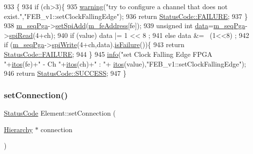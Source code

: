 \begin{DoxyCode}
933                                                                   \{
934   \textcolor{keywordflow}{if} (ch>3)\{
935     \hyperlink{classObject_a65cd4fda577711660821fd2cd5a3b4c9}{warning}(\textcolor{stringliteral}{"try to configure a channel that does not exist."},\textcolor{stringliteral}{"FEB\_v1::setClockFallingEdge"});
936     \textcolor{keywordflow}{return} \hyperlink{classStatusCode_a6f565cbeadc76d14c72f047e5e85eb4ba3da73d4c469762eb9d3c960368252b26}{StatusCode::FAILURE};
937   \}
938   \hyperlink{classFEB__v1_a6c7804ac86796f233a8393043adf2e77}{m\_seqPga}->\hyperlink{classSeqPGA_ac998ce3a6d9b5f2e88cc8393f8c1df53}{setSpiAdd}(\hyperlink{classFEB__v1_a4e1945c2d5b434125f375e9d0fc6d99f}{m\_feAddress}[fe]);
939   \textcolor{keywordtype}{unsigned} \textcolor{keywordtype}{int} \hyperlink{classFEB__v1_a6bca4320bd3bbbc32efc81097f33421a}{data}=\hyperlink{classFEB__v1_a6c7804ac86796f233a8393043adf2e77}{m\_seqPga}->\hyperlink{classSeqPGA_ab3d0e5e5d4014bc7a92588a76b8713d4}{spiRead}(4+ch);
940   \textcolor{keywordflow}{if} (value)  data |= 1 << 8  ;
941   \textcolor{keywordflow}{else}        data &= ~(1<<8) ;
942   \textcolor{keywordflow}{if} (\hyperlink{classFEB__v1_a6c7804ac86796f233a8393043adf2e77}{m\_seqPga}->\hyperlink{classSeqPGA_ad4421841ce4ce8b88ad13f63216f0743}{spiWrite}(4+ch,data).\hyperlink{classStatusCode_a5dd22dc6eb2c52fc4cabc58f6dea2eb7}{isFailure}())\{
943     \textcolor{keywordflow}{return} \hyperlink{classStatusCode_a6f565cbeadc76d14c72f047e5e85eb4ba3da73d4c469762eb9d3c960368252b26}{StatusCode::FAILURE};
944   \}
945   \hyperlink{classObject_a644fd329ea4cb85f54fa6846484b84a8}{info}(\textcolor{stringliteral}{"set Clock Falling Edge FPGA "}+\hyperlink{Tools_8h_af330027dbdafb9a30768b3613c553e60}{itos}(fe)+\textcolor{stringliteral}{" - Ch "}+\hyperlink{Tools_8h_af330027dbdafb9a30768b3613c553e60}{itos}(ch)+\textcolor{stringliteral}{" : "}+
      \hyperlink{Tools_8h_af330027dbdafb9a30768b3613c553e60}{itos}(value),\textcolor{stringliteral}{"FEB\_v1::setClockFallingEdge"});
946   \textcolor{keywordflow}{return} \hyperlink{classStatusCode_a6f565cbeadc76d14c72f047e5e85eb4badd0da38d3ba0d922efd1f4619bc37ad8}{StatusCode::SUCCESS};
947 \}
\end{DoxyCode}
\mbox{\label{classElement_ab476b4b1df5954141ceb14f072433b89}} 
\subsubsection{\texorpdfstring{set\+Connection()}{setConnection()}}
{\footnotesize\ttfamily \hyperlink{classStatusCode}{Status\+Code} Element\+::set\+Connection (\begin{DoxyParamCaption}\item[{\hyperlink{classHierarchy}{Hierarchy} $\ast$}]{connection }\end{DoxyParamCaption})\hspace{0.3cm}{\ttfamily [inherited]}}

